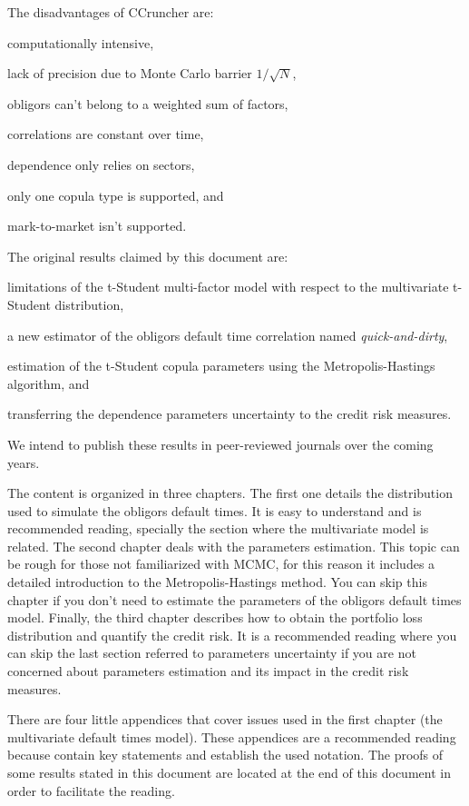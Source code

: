 \documentclass[11pt,fleqn]{book} %
\begin{document}
The disadvantages of CCruncher are: 
\begin{inparaenum}[1)]
	\item computationally intensive,
	\item lack of precision due to Monte Carlo barrier $1/\sqrt{N}$,
	\item obligors can't belong to a weighted sum of factors,
	\item correlations are constant over time,
	\item dependence only relies on sectors,
	\item only one copula type is supported, and
	\item mark-to-market isn't supported.
\end{inparaenum}

The original results claimed by this document are: 
\begin{inparaenum}[1)]
	\item limitations of the t-Student multi-factor model with respect to 
	the multivariate t-Student distribution,
	\item a new estimator of the obligors default time correlation named 
	\emph{quick-and-dirty},
	\item estimation of the t-Student copula parameters using the 
	Metropolis-Hastings algorithm, and
	\item transferring the dependence parameters uncertainty to the credit 
	risk measures.
\end{inparaenum}
We intend to publish these results in peer-reviewed journals over the coming years.

The content is organized in three chapters. The first one details the 
distribution used to simulate the obligors default times. It is easy to 
understand and is recommended reading, specially the section where the 
multivariate model is related. The second chapter deals with the parameters 
estimation. This topic can be rough for those not familiarized 
with MCMC, for this reason it includes a detailed introduction to the 
Metropolis-Hastings method. You can skip this chapter if you don't need 
to estimate the parameters of the obligors default times model. Finally, the 
third chapter describes how to obtain the portfolio loss distribution and 
quantify the credit risk. It is a recommended reading where you can skip the 
last section referred to parameters uncertainty if you are not concerned about 
parameters estimation and its impact in the credit risk measures.

There are four little appendices that cover issues used in the first chapter 
(the multivariate default times model). These appendices are a recommended 
reading because contain key statements and establish the used notation.
The proofs of some results stated in this document are located at the end of 
this document in order to facilitate the reading.
\end{document}
